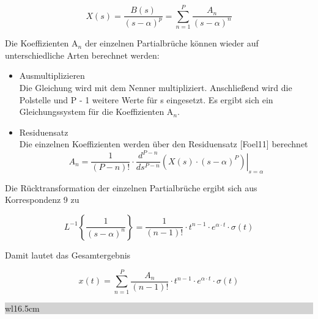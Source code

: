 \begin{equation}\label{eq:fourhundredsfourtytwo}
X\left(s\right)=\frac{B\left(s\right)}{\left(s-\alpha \right)^{p} } =\sum _{n=1}^{P}\frac{A_{n} }{\left(s-\alpha \right)^{n} } 
\end{equation}

\noindent Die Koeffizienten A$_{n}$ der einzelnen Partialbrüche können wieder auf unterschiedliche Arten berechnet werden:

\begin{itemize}
    \item  Ausmultiplizieren\\
    Die Gleichung wird mit dem Nenner multipliziert. Anschlie{\ss}end wird die Polstelle und P - 1 weitere Werte f\"{u}r s eingesetzt. Es ergibt sich ein Gleichungssystem für die Koeffizienten A$_{n}$. 

    \item  Residuensatz\\
    Die einzelnen Koeffizienten werden \"{u}ber den Residuensatz [Foel11] berechnet\\
    \begin{equation}\label{eq:fourhundredsfourtythree}
    A_{n} =\frac{1}{\left(P-n\right)!} \cdot \frac{d^{P-n} }{ds^{P-n} } \left. \left(X\left(s\right)\cdot \left(s-\alpha \right)^{P} \right)\right|_{s=\alpha }
    \end{equation}
    
\end{itemize}

\noindent Die Rücktransformation der einzelnen Partialbrüche ergibt sich aus Korrespondenz 9 zu

\begin{equation}\label{eq:fourhundredsfourtyfour}
L^{-1} \left\{\frac{1}{\left(s-\alpha \right)^{n} } \right\}=\frac{1}{\left(n-1\right)!} \cdot t^{n-1} \cdot e^{\alpha \cdot t} \cdot \sigma \left(t\right)
\end{equation}

\noindent Damit lautet das Gesamtergebnis

\begin{equation}\label{eq:fourhundredsfourtyfive}
x\left(t\right)=\sum _{n=1}^{P}\frac{A_{n} }{\left(n-1\right)!} \cdot t^{n-1} \cdot e^{\alpha \cdot t} \cdot \sigma \left(t\right)
\end{equation}

\clearpage

\noindent
\colorbox{lightgray}{%
%
\renewcommand\arraystretch{0.6}%
\begin{tabular}{ wl{16.5cm} }
{\selectfont{Beispiel: Partialbruchzerlegung für mehrfache Pole bei $\alpha$} }
\end{tabular}%
}\bigskip

